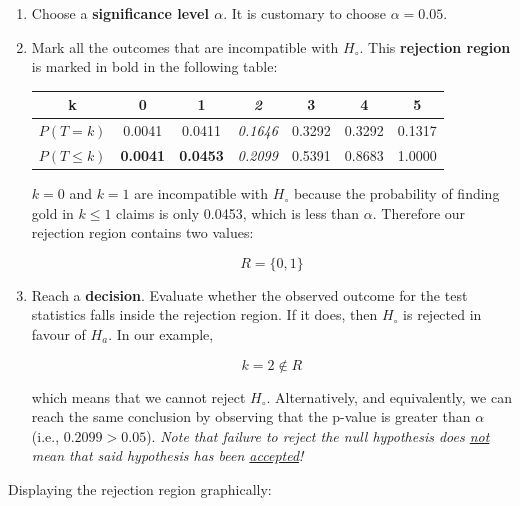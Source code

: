 \begin{enumerate}
\item Choose a \textbf{significance level $\alpha$}. It is customary
  to choose $\alpha=0.05$.

\item\label{it:rejection} Mark all the outcomes that are incompatible
  with $H_\circ$.  This \textbf{rejection region} is marked in bold in
  the following table:

  \begin{center}
  \begin{tabular}{ccccccc}
    k & \textbf{0} & \textbf{1} & \textit{2} & 3 & 4 & 5 \\ \hline
    $P(T=k)$ & 0.0041 & 0.0411 & \textit{0.1646} & 0.3292 & 0.3292 & 0.1317 \\
    $P({T}\leq{k})$ & \textbf{0.0041} & \textbf{0.0453} &
    \textit{0.2099} & 0.5391 & 0.8683 & 1.0000
  \end{tabular}
  \end{center}

  $k=0$ and $k=1$ are incompatible with $H_\circ$ because the
  probability of finding gold in $k\leq{1}$ claims is only 0.0453,
  which is less than $\alpha$. Therefore our rejection region contains
  two values:
  
  \[
  R = \{0,1\}
  \]

\item\label{it:decision} Reach a \textbf{decision}. Evaluate whether
  the observed outcome for the test statistics falls inside the
  rejection region. If it does, then $H_\circ$ is rejected in favour
  of $H_a$. In our example,

  \[
  k=2\notin{R}
  \]

  \noindent which means that we cannot reject $H_\circ$.
  Alternatively, and equivalently, we can reach the same conclusion by
  observing that the p-value is greater than $\alpha$ (i.e.,
  $0.2099>0.05$). \textit{Note that failure to reject the null
    hypothesis does \underline{not} mean that said hypothesis has been
    \underline{accepted}!}\label{pag:notaccepted}
  
\end{enumerate}

Displaying the rejection region graphically:\\

